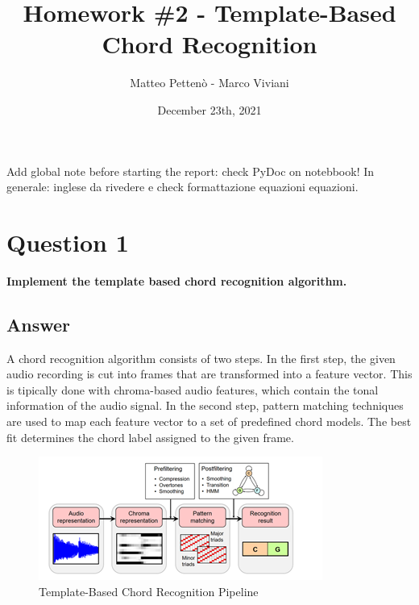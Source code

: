 \documentclass[
	12pt, %
]{fphw}
\title{Homework \#2 - Template-Based Chord Recognition} %
\author{Matteo Pettenò - Marco Viviani} %
\date{December 23th, 2021} %
\institute{Politecnico di Milano} %
\begin{document}
\maketitle %


\color{red}
Add global note before starting the report: check PyDoc on notebbook!
In generale: inglese da rivedere e check formattazione equazioni equazioni.
\color{black}


\section*{\color{red}Question 1}

\begin{problem}
	\textbf{Implement the template based chord recognition algorithm.}
\end{problem}

\subsection*{\color{blue}Answer}

A chord recognition algorithm consists of two steps. In the first step, the given audio recording is cut into frames that are transformed into a feature vector. This is tipically done with chroma-based audio features, which contain the tonal information of the audio signal.
In the second step, pattern matching techniques are used to map each feature vector to a set of predefined chord models. The best fit determines the chord label assigned to the given frame.

\begin{figure}[H]
 \centering
 \includegraphics[scale=1]{./images/1_template_based_pipeline.png}
 \caption{Template-Based Chord Recognition Pipeline}
\end{figure}
\end{document}
